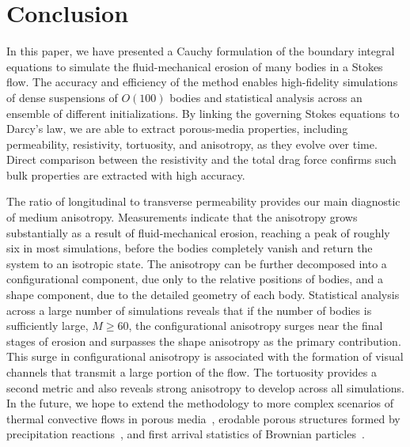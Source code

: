 \documentclass[3p]{elsarticle}
\begin{document}
\section{Conclusion}
\label{sec:conclusion}

In this paper, we have presented a Cauchy formulation of the boundary integral equations to simulate the fluid-mechanical erosion of many bodies in a Stokes flow. The accuracy and efficiency of the method enables high-fidelity simulations of dense suspensions of $O(100)$ bodies and statistical analysis across an ensemble of different initializations. By linking the governing Stokes equations to Darcy's law, we are able to extract porous-media properties, including permeability, resistivity, tortuosity, and anisotropy, as they evolve over time. Direct comparison between the resistivity and the total drag force confirms such bulk properties are extracted with high accuracy.

The ratio of longitudinal to transverse permeability provides our main diagnostic of medium anisotropy. Measurements indicate that the anisotropy grows substantially as a result of fluid-mechanical erosion, reaching a peak of roughly six in most simulations, before the bodies completely vanish and return the system to an isotropic state. The anisotropy can be further decomposed into a configurational component, due only to the relative positions of bodies, and a shape component, due to the detailed geometry of each body. Statistical analysis across a large number of simulations reveals that if the number of bodies is sufficiently large, $M \ge 60$, the configurational anisotropy surges near the final stages of erosion and surpasses the shape anisotropy as the primary contribution. This surge in configurational anisotropy is associated with the formation of visual channels that transmit a large portion of the flow. The tortuosity provides a second metric and also reveals strong anisotropy to develop across all simulations. In the future, we hope to extend the methodology to more complex scenarios of thermal convective flows in porous media~\cite{McCurdy2019}, erodable porous structures formed by precipitation reactions~\cite{eastham2020multiphase}, and first arrival statistics of Brownian particles~\cite{che-lin-her-qua2021}. 

\end{document}
